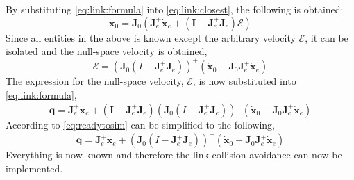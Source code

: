 \documentclass[../main.tex]{subfiles}
\begin{document}
By substituting \autoref{eq:link:formula} into \autoref{eq:link:closest}, the following is obtained:
\begin{equation}
    \dot{\boldsymbol{x}}_0 = \boldsymbol{J}_0 \left( \boldsymbol{J}_e^+\dot{\boldsymbol{x}}_e + \left( \boldsymbol{I} - \boldsymbol{J}_e^+\boldsymbol{J}_e \right)\boldsymbol{\mathcal{E}} \right)
\end{equation}
Since all entities in the above is known except the arbitrary velocity $\boldsymbol{\mathcal{E}}$, it can be isolated and the null-space velocity is obtained,
\begin{equation} \label{eq:link:nullspacevelocity}
    \boldsymbol{\mathcal{E}} = \left(\boldsymbol{J}_0(I-\boldsymbol{J}_e^+\boldsymbol{J}_e)\right)^+(\dot{\boldsymbol{x}}_0 - \boldsymbol{J}_0\boldsymbol{J}_e^+\dot{\boldsymbol{x}}_e)
\end{equation}
The expression for the null-space velocity, $\boldsymbol{\mathcal{E}}$, is now substituted into \autoref{eq:link:formula},
\begin{equation} \label{eq:readytosim}
    \dot{\boldsymbol{q}} = \boldsymbol{J}^+_e\dot{\boldsymbol{x}}_e + \left( \boldsymbol{I} - \boldsymbol{J}_e^+\boldsymbol{J}_e \right)\left(\boldsymbol{J}_0(I-\boldsymbol{J}_e^+\boldsymbol{J}_e)\right)^+(\dot{\boldsymbol{x}}_0 - \boldsymbol{J}_0\boldsymbol{J}_e^+\dot{\boldsymbol{x}}_e)
\end{equation}
According to \cite{maciejewski_obstacle_1985} \autoref{eq:readytosim} can be simplified to the following,
\begin{equation} \label{eq:link:final}
        \dot{\boldsymbol{q}} = \boldsymbol{J}^+_e\dot{\boldsymbol{x}}_e +\left(\boldsymbol{J}_0(I-\boldsymbol{J}_e^+\boldsymbol{J}_e)\right)^+(\dot{\boldsymbol{x}}_0 - \boldsymbol{J}_0\boldsymbol{J}_e^+\dot{\boldsymbol{x}}_e)
\end{equation}
Everything is now known and therefore the link collision avoidance can now be implemented.
\end{document}
